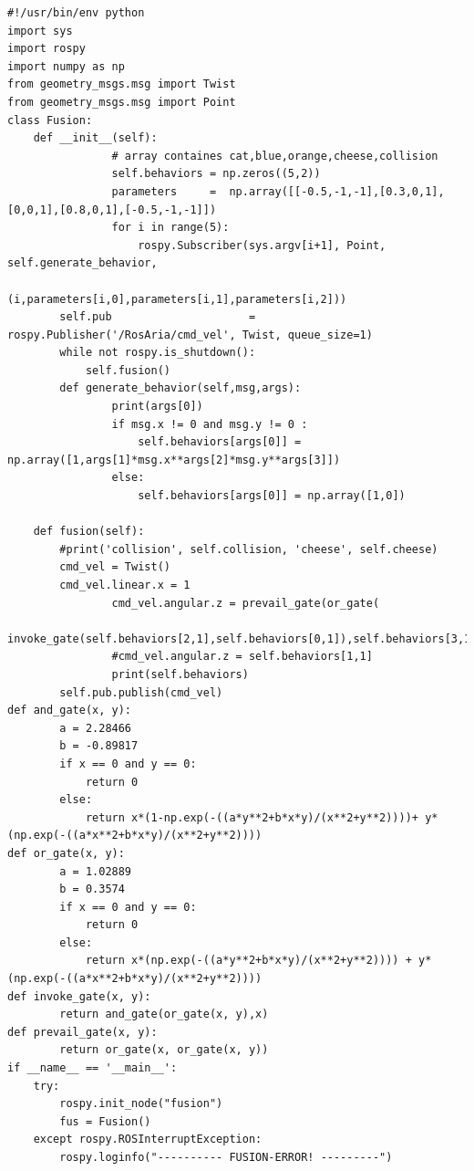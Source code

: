 \documentclass[11pt,a4paper]{article}
\begin{document}
\begin{tiny}
\begin{lstlisting}
#!/usr/bin/env python
import sys
import rospy
import numpy as np
from geometry_msgs.msg import Twist
from geometry_msgs.msg import Point
class Fusion:
	def __init__(self):
                # array containes cat,blue,orange,cheese,collision
                self.behaviors = np.zeros((5,2))
                parameters     =  np.array([[-0.5,-1,-1],[0.3,0,1],[0,0,1],[0.8,0,1],[-0.5,-1,-1]])
                for i in range(5):
                    rospy.Subscriber(sys.argv[i+1], Point, self.generate_behavior,
                    (i,parameters[i,0],parameters[i,1],parameters[i,2]))
		self.pub                     = rospy.Publisher('/RosAria/cmd_vel', Twist, queue_size=1)
		while not rospy.is_shutdown():
			self.fusion()
        def generate_behavior(self,msg,args):
                print(args[0])
                if msg.x != 0 and msg.y != 0 :
                    self.behaviors[args[0]] = np.array([1,args[1]*msg.x**args[2]*msg.y**args[3]])
                else:
                    self.behaviors[args[0]] = np.array([1,0])

	def fusion(self):
		#print('collision', self.collision, 'cheese', self.cheese)
		cmd_vel = Twist()
		cmd_vel.linear.x = 1
                cmd_vel.angular.z = prevail_gate(or_gate(
                invoke_gate(self.behaviors[2,1],self.behaviors[0,1]),self.behaviors[3,1]),self.behaviors[4,1])
                #cmd_vel.angular.z = self.behaviors[1,1]
                print(self.behaviors)
		self.pub.publish(cmd_vel)
def and_gate(x, y):
        a = 2.28466
        b = -0.89817
        if x == 0 and y == 0:
            return 0
        else:
            return x*(1-np.exp(-((a*y**2+b*x*y)/(x**2+y**2))))+ y*(np.exp(-((a*x**2+b*x*y)/(x**2+y**2))))
def or_gate(x, y):
        a = 1.02889
        b = 0.3574
        if x == 0 and y == 0:
            return 0
        else:
            return x*(np.exp(-((a*y**2+b*x*y)/(x**2+y**2)))) + y*(np.exp(-((a*x**2+b*x*y)/(x**2+y**2))))
def invoke_gate(x, y):
        return and_gate(or_gate(x, y),x)
def prevail_gate(x, y):
        return or_gate(x, or_gate(x, y))
if __name__ == '__main__':
	try:
		rospy.init_node("fusion")
		fus = Fusion()	
	except rospy.ROSInterruptException:
		rospy.loginfo("---------- FUSION-ERROR! ---------")
\end{lstlisting}
\end{tiny}
\newpage


\end{document}
